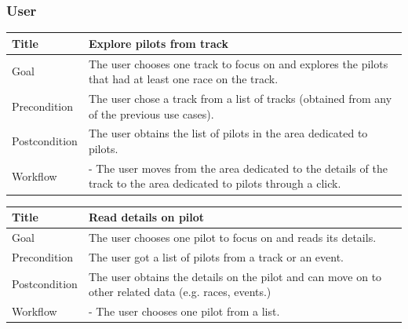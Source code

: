 \documentclass{beamer}
\begin{document}
\begin{frame}
    \frametitle{User}
    \begin{table}
        \tiny
        \begin{tabular}{|p{2cm}|p{6cm}|}
        \hline
        Title & \textbf{Explore pilots from track} \\
        \hline
        Goal & The user chooses one track to focus on and explores the pilots that had at least one race on the track. \\
        \hline
        Precondition & The user chose a track from a list of tracks (obtained from any of the previous use cases).\\
        \hline
        Postcondition & The user obtains the list of pilots in the area dedicated to pilots. \\
        \hline
        Workflow &
        - The user moves from the area dedicated to the details of the track to the
        area dedicated to pilots through a click. \\
        \hline
        \end{tabular}
\end{table}

\begin{table}
    \tiny
    \begin{tabular}{|p{2cm}|p{6cm}|}
    \hline
    Title & \textbf{Read details on pilot} \\
    \hline
    Goal & The user chooses one pilot to focus on and reads its details. \\
    \hline
    Precondition & The user got a list of pilots from a track or an event.\\
    \hline
    Postcondition & The user obtains the details on the pilot and can move on to other related data (e.g. races, events.) \\
    \hline
    Workflow &
    - The user chooses one pilot from a list. \\
    \hline
    \end{tabular}
\end{table}
\end{frame}


\end{document}
